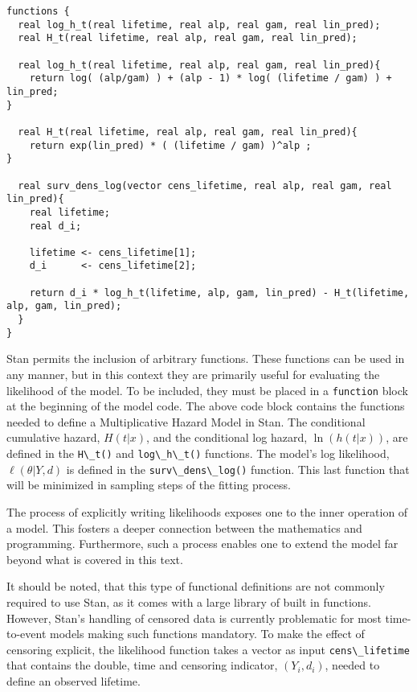 \begin{lstlisting}
functions {
  real log_h_t(real lifetime, real alp, real gam, real lin_pred);
  real H_t(real lifetime, real alp, real gam, real lin_pred);

  real log_h_t(real lifetime, real alp, real gam, real lin_pred){
    return log( (alp/gam) ) + (alp - 1) * log( (lifetime / gam) ) + lin_pred;
}

  real H_t(real lifetime, real alp, real gam, real lin_pred){
    return exp(lin_pred) * ( (lifetime / gam) )^alp ;
}

  real surv_dens_log(vector cens_lifetime, real alp, real gam, real lin_pred){
    real lifetime;
    real d_i;
  
    lifetime <- cens_lifetime[1];
    d_i      <- cens_lifetime[2];
    
    return d_i * log_h_t(lifetime, alp, gam, lin_pred) - H_t(lifetime, alp, gam, lin_pred);
  }
}
\end{lstlisting}


Stan permits the inclusion of arbitrary functions. These functions can be used in any manner, but in this context they are primarily useful for evaluating the likelihood of the model. To be included, they must be placed in a \lstinline{function} block at the beginning of the model code. The above code block contains the functions needed to define a Multiplicative Hazard Model in Stan. The conditional cumulative hazard, $H(t|x)$, and the conditional log hazard, $\ln(h(t|x))$, are defined in the \lstinline{H\_t()} and \lstinline{log\_h\_t()} functions. The model's log likelihood, $\ell(\theta|Y, d)$ is defined in the \lstinline{surv\_dens\_log()} function. This last function that will be minimized in sampling steps of the fitting process. 

The process of explicitly writing likelihoods exposes one to the inner operation of a model. This fosters a deeper connection between the mathematics and programming. Furthermore, such a process enables one to extend the model far beyond what is covered in this text.

It should be noted, that this type of functional definitions are not commonly required to use Stan, as it comes with a large library of built in functions\cite{StanDevelopmentTeam2016}. However, Stan's handling of censored data is currently problematic for most time-to-event models making such functions mandatory. To make the effect of censoring explicit, the likelihood function takes a vector as input \lstinline{cens\_lifetime} that contains the double, time and censoring indicator, $(Y_i,d_i)$, needed to define an observed lifetime. 

